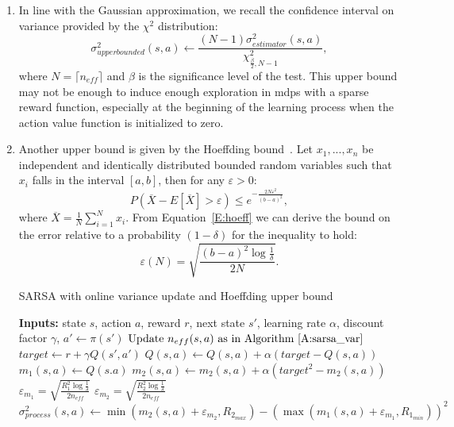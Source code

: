 \begin{enumerate}
\item  In line with the Gaussian approximation, we recall the confidence interval on variance provided by the $\chi^2$ distribution:
\begin{equation}
 \sigma^2_{upper bounded}(s,a) \gets \frac{(N - 1)\sigma^2_{estimator}(s,a)}{ \chi^2_{\frac{\beta}{2}, N - 1}},
\end{equation}
where $N = \lceil{n_{eff}}\rceil$ and $\beta$ is the significance level of the test. This upper bound may not be enough to induce enough exploration in \glspl{mdp} with a sparse reward function, especially at the beginning of the learning process when the action value function is initialized to zero.
\item Another upper bound is given by the Hoeffding bound~\cite{hoeffding1963probability}. Let $x_1, ... , x_n$ be independent and identically distributed bounded random variables such that $x_i$ falls in the interval $[a, b]$, then for any $\varepsilon > 0$:
\begin{equation}\label{E:hoeff}
 P( \overline{X} - E[\overline{X}]  > \varepsilon ) \leq e^{-\frac{2N \varepsilon^2}{(b-a)^2}},
\end{equation}
where $\overline{X} = \frac{1}{N}\sum_{i=1}^N{x_i}$. From Equation~\ref{E:hoeff} we can derive the bound on the error relative to a probability $(1-\delta)$ for the inequality to hold:
\begin{equation}
 \varepsilon(N) = \sqrt{\frac{(b-a)^2\log{\frac{1}{\delta}}}{2N}}.
\end{equation}
\begin{algorithm}
\caption{SARSA with online variance update and Hoeffding upper bound}
\begin{algorithmic}[1]\label{A:sarsa_hoeff}
  \STATE \textbf{Inputs:} state $s$, action $a$, reward $r$, next state $s'$, learning rate $\alpha$, discount factor $\gamma$, 
  \STATE $a' \gets \pi(s')$
  \STATE $\text{Update } n_{eff}(s,a) \text{ as in Algorithm~\ref{A:sarsa_var}}$
  \STATE $target \gets r + \gamma Q(s',a')$
  \STATE $Q(s,a) \gets Q(s,a) + \alpha (target - Q(s,a))$
  \STATE $m_1(s,a) \gets Q(s.a)$
  \STATE $m_2(s,a) \gets m_2(s,a) + \alpha \left(target^2 - m_2(s,a)\right)$
  \STATE $\varepsilon_{m_1} = \sqrt{\frac{R_1^2\log{\frac{1}{\delta}}}{2n_{eff}}}$ 
  \STATE $\varepsilon_{m_2} = \sqrt{\frac{R_2^2\log{\frac{1}{\delta}}}{2n_{eff}}}$
  \STATE $\sigma^2_{process}(s,a) \gets \min(m_2(s,a) + \varepsilon_{m_2}, R_{2_{max}}) - \left(\max(m_1(s,a) + \varepsilon_{m_1}, R_{1_{min}})\right)^2$

\end{algorithmic}
\end{algorithm}
\end{enumerate}
